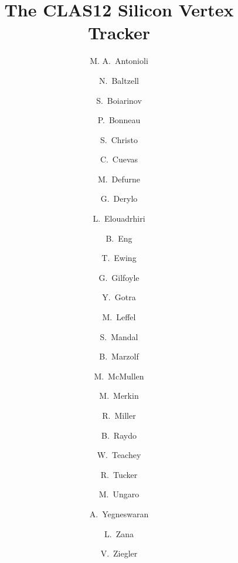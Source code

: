 \title{The CLAS12 Silicon Vertex Tracker}

\author[A]{M. A.~Antonioli}
\author[A]{N.~Baltzell}
\author[A]{S.~Boiarinov}
\author[A]{P.~Bonneau}
\author[A]{S.~Christo}
\author[A]{C.~Cuevas}
\author[B]{M.~Defurne}
\author[C]{G.~Derylo}
\author[A]{L.~Elouadrhiri}
\author[A]{B.~Eng}
\author[A]{T.~Ewing}
\author[D]{G.~Gilfoyle}
\author[A]{Y.~Gotra}
\author[A]{M.~Leffel}
\author[A]{S.~Mandal}
\author[A]{B.~Marzolf}
\author[A]{M.~McMullen}
\author[E]{M.~Merkin}
\author[A]{R.~Miller}
\author[A]{B.~Raydo}
\author[A]{W.~Teachey}
\author[F]{R.~Tucker}
\author[A]{M.~Ungaro}
\author[A]{A.~Yegneswaran}
\author[A]{L.~Zana}
\author[A]{V.~Ziegler}

\address[A]{Thomas Jefferson National Accelerator Facility, Newport News, VA, USA}
\address[B]{Irfu, CEA, Universit\'e Paris-Saclay, 91191, Gif-sur-Yvette, France}
\address[C]{Fermi National Accelerator Laboratory, Batavia, IL, USA}
\address[D]{University of Richmond, Richmond, VA, USA}
\address[E]{Skobeltsyn Institute of Nuclear Physics, Moscow State University, Moscow, Russia}
\address[F]{Arizona State University, Tempe, AZ}

